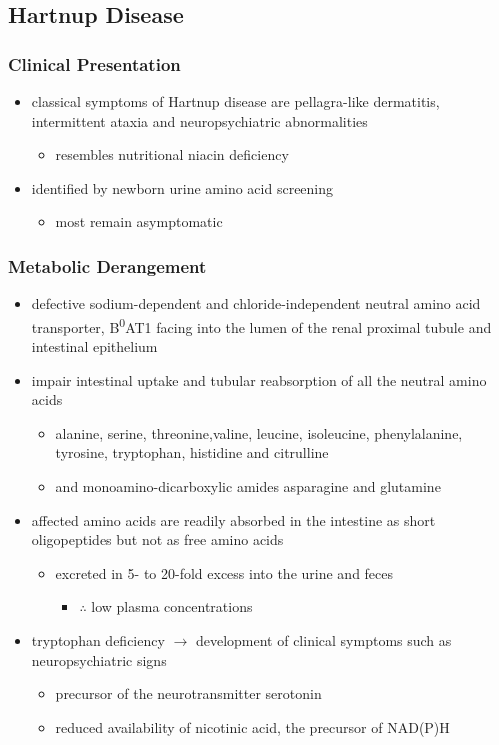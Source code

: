 \documentclass{scrartcl}
\begin{document}
\subsection{Hartnup Disease}
\label{sec:orgead8f0a}
\subsubsection{Clinical Presentation}
\label{sec:org25fcd67}
\begin{itemize}
\item classical symptoms of Hartnup disease are pellagra-like dermatitis,
intermittent ataxia and neuropsychiatric abnormalities
\begin{itemize}
\item resembles nutritional niacin deficiency
\end{itemize}
\item identified by newborn urine amino acid screening
\begin{itemize}
\item most remain asymptomatic
\end{itemize}
\end{itemize}

\subsubsection{Metabolic Derangement}
\label{sec:org4630a10}
\begin{itemize}
\item defective sodium-dependent and chloride-independent neutral amino
acid transporter, B\textsuperscript{0}AT1 facing into the lumen of the renal proximal
tubule and intestinal epithelium
\item impair intestinal uptake and tubular reabsorption of all the neutral
amino acids
\begin{itemize}
\item alanine, serine, threonine,valine, leucine, isoleucine,
phenylalanine, tyrosine, tryptophan, histidine and citrulline
\item and monoamino-dicarboxylic amides asparagine and glutamine
\end{itemize}
\item affected amino acids are readily absorbed in the intestine as short
oligopeptides but not as free amino acids
\begin{itemize}
\item excreted in 5- to 20-fold excess into the urine and feces
\begin{itemize}
\item \(\therefore\) low plasma concentrations
\end{itemize}
\end{itemize}
\item tryptophan deficiency \(\to\) development of clinical symptoms such as
neuropsychiatric signs
\begin{itemize}
\item precursor of the neurotransmitter serotonin
\item reduced availability of nicotinic acid, the precursor of NAD(P)H
\end{itemize}
\end{itemize}
\end{document}
